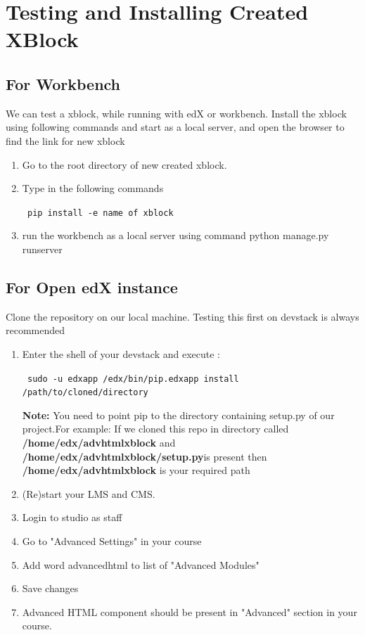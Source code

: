 \section{Testing and Installing Created XBlock}
\subsection{For Workbench}
We can test a xblock, while running with edX or workbench. Install the xblock using following
commands and start as a local server, and open the browser to find the link for new xblock
\begin{enumerate}
\item Go to the root directory of new created xblock.
\item Type in the following commands\begin{center}\verb= pip install -e name of xblock=\end{center}
\item run the workbench as a local server using command python manage.py
runserver
\end{enumerate}


\subsection{For Open edX instance}
Clone the repository on our local machine. Testing this first on devstack is always recommended
\begin{enumerate}
\item Enter the shell of your devstack and execute :
\begin{center}\verb= sudo -u edxapp /edx/bin/pip.edxapp install /path/to/cloned/directory=\end{center}
\textbf{Note:} You need to point pip to the directory containing setup.py of our project.\newline For
example: If we cloned this repo in directory called\textbf{ /home/edx/advhtmlxblock} and
\textbf{/home/edx/advhtmlxblock/setup.py}is present then\textbf{ /home/edx/advhtmlxblock} is your
required path
\item (Re)start your LMS and CMS.
\item Login to studio as staff
\item Go to "Advanced Settings" in your course
\item Add word advancedhtml to list of "Advanced Modules"
\item Save changes
\item Advanced HTML component should be present in "Advanced" section in your course.
\end{enumerate}




